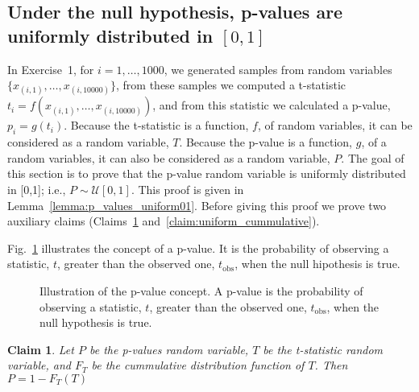 \documentclass[12pt]{article}
\newtheorem{claim}{Claim}
\def\fig_width{3.5in}
\begin{document}
\pagebreak
\begin{appendices}

\section{Under the null hypothesis, p-values are uniformly distributed in $[0,1]$}
\label{sec:pValuesAreUniform}

In Exercise~1, for $i=1,\ldots,1000$, we generated samples from random variables
$\{x_{(i,1)},\ldots,x_{(i,10000)}\}$, from these samples we computed a t-statistic
$t_i=f(x_{(i,1)},\ldots,x_{(i,10000)})$, and from this statistic we calculated a
p-value, $p_i=g(t_i)$. Because the t-statistic is a function, $f$, of random
variables, it can be considered as a random variable, $T$. Because the
p-value is a function, $g$, of a random variables, it can also be considered as
a random variable, $P$. The goal of this section is to prove that the p-value random
variable is uniformly distributed in [0,1]; i.e., $P\sim\mathcal{U}[0,1]$. This
proof is given in Lemma~\ref{lemma:p_values_uniform01}. Before giving this
proof we prove two auxiliary claims (Claims~\ref{claim:pvalue_as_function_of_stat}
and~\ref{claim:uniform_cummulative}).

Fig.~\ref{fig:pvalue} illustrates the concept of a p-value. It is the
probability of observing a statistic, $t$, greater than the observed one,
$t_\text{obs}$, when the null hipothesis is true.

\begin{figure}[H]
    \begin{center}

        \caption{Illustration of the p-value concept. A p-value is the
        probability of observing a statistic, $t$, greater than the observed
        one, $t_\text{obs}$, when the null hypothesis is true.}
        \label{fig:pvalue}

    \end{center}
\end{figure}

\begin{claim}

    Let $P$ be the p-values random variable, $T$ be the t-statistic random
    variable, and $F_T$ be the cummulative distribution function of $T$. Then
    $P=1-F_T(T)$
    \label{claim:pvalue_as_function_of_stat}

\end{claim}


\end{appendices}
\end{document}
